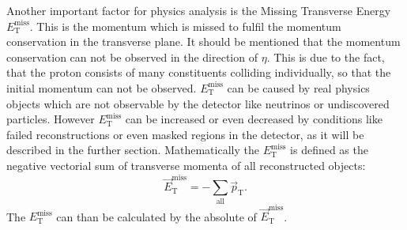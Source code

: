 Another important factor for physics analysis is the Missing Transverse Energy $E_{\mathrm{T}}^{\mathrm{miss}}$.
This is the momentum which is missed to fulfil the momentum conservation in the transverse plane.
It should be mentioned that the momentum conservation can not be observed in the direction of $\eta$.
This is due to the fact, that the proton consists of many constituents colliding individually, so that the initial momentum can not be observed.
$E_{\mathrm{T}}^{\mathrm{miss}}$ can be caused by real physics objects which are not observable by the detector like neutrinos or undiscovered particles.
However $E_{\mathrm{T}}^{\mathrm{miss}}$ can be increased or even decreased by conditions like failed reconstructions or even masked regions in the detector, as it will be described in the further section.
Mathematically the $E_{\mathrm{T}}^{\mathrm{miss}}$ is defined as the negative vectorial sum of transverse momenta  of all reconstructed objects:
\begin{equation}
\vec{E}_{\mathrm{T}}^{\mathrm{miss}} = -\sum_{\mathrm{all}} \vec{p}_{\text{T}}.
\end{equation}
The $E_{\mathrm{T}}^{\mathrm{miss}}$ can than be calculated by the absolute of $\vec{E}_{\mathrm{T}}^{\mathrm{miss}}$.

